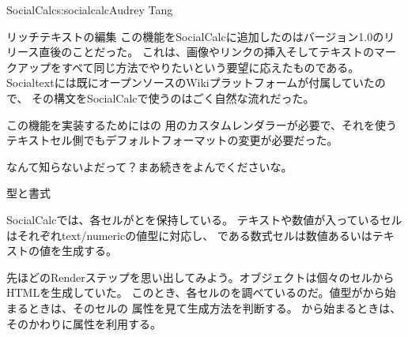 \begin{aosachapter}{SocialCalc}{s:socialcalc}{Audrey Tang}
\begin{aosasect1}{リッチテキストの編集}
この機能をSocialCalcに追加したのはバージョン1.0のリリース直後のことだった。
これは、画像やリンクの挿入そしてテキストのマークアップをすべて同じ方法でやりたいという要望に応えたものである。
Socialtextには既にオープンソースのWikiプラットフォームが付属していたので、
その構文をSocialCalcで使うのはごく自然な流れだった。

この機能を実装するためにはの
用のカスタムレンダラーが必要で、それを使うテキストセル側でもデフォルトフォーマットの変更が必要だった。

なんて知らないよだって？まあ続きをよんでくださいな。

\begin{aosasect2}{型と書式}

SocialCalcでは、各セルがとを保持している。
テキストや数値が入っているセルはそれぞれtext/numericの値型に対応し、
である数式セルは数値あるいはテキストの値を生成する。

先ほどのRenderステップを思い出してみよう。オブジェクトは個々のセルからHTMLを生成していた。
このとき、各セルのを調べているのだ。値型がから始まるときは、そのセルの
属性を見て生成方法を判断する。
から始まるときは、そのかわりに属性を利用する。


\end{aosasect2}
\end{aosasect1}
\end{aosachapter}
